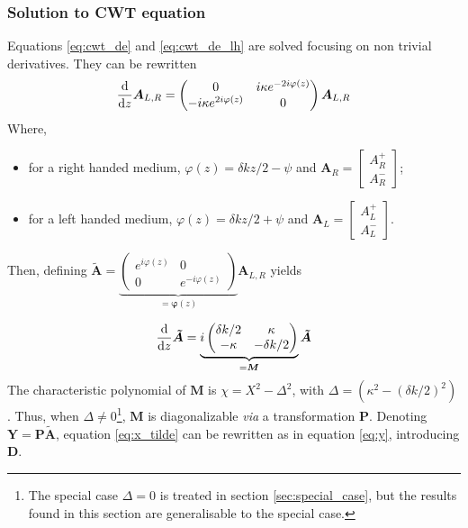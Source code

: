 \subsubsection{Solution to CWT equation}

Equations \ref{eq:cwt_de} and \ref{eq:cwt_de_lh} are solved focusing on non trivial derivatives. They can be rewritten
\begin{equation}
	\dv{z}\bm{A}_{L,R} = \begin{pmatrix}0 & i\kappa e^{-2i\varphi(z)} \\ -i\kappa e^{2i\varphi(z)} & 0\end{pmatrix}\bm{A}_{L,R}
\end{equation}
Where,
\begin{itemize}
	\item for a right handed medium, $\varphi(z) = \delta kz / 2 - \psi$ and $\bm{A}_R = \begin{bmatrix}A^+_R\\A^-_R\end{bmatrix}$;
	\item for a left handed medium, $\varphi(z) = \delta kz / 2 + \psi$ and $\bm{A}_L = \begin{bmatrix}A^+_L\\A^-_L\end{bmatrix}$.
\end{itemize}
Then, defining $\bm{\tilde{A}} = \underbrace{\begin{pmatrix}e^{i\varphi(z)} & 0 \\ 0 & e^{-i\varphi(z)}\end{pmatrix}}_{=\bm{\varphi}(z)}\bm{A}_{L,R}$ yields

\begin{equation}
\dv{z}\bm{\tilde{A}} = \underbrace{i\begin{pmatrix}\delta k / 2 & \kappa \\ -\kappa & -\delta k / 2\end{pmatrix}}_{=\bm{M}}\bm{\tilde{A}} \label{eq:x_tilde}
\end{equation}
The characteristic polynomial of $\bm{M}$ is $\chi = X^2 - \Delta^2$, with $ \Delta = (\kappa^2 - (\delta k / 2)^2)$. Thus, when $\Delta \neq 0$\footnote{The special case $\Delta=0$ is treated in section \ref{sec:special_case}, but the results found in this section are generalisable to the special case.}, $\bm{M}$ is diagonalizable \textit{via} a transformation $\bm{P}$. Denoting $\bm{Y} = \bm{P}\bm{\tilde{A}}$, equation \ref{eq:x_tilde} can be rewritten as in equation \ref{eq:y}, introducing $\bm{D}$.


